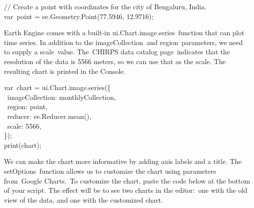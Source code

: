 \documentclass[
  letterpaper,
  DIV=11,
  numbers=noendperiod]{scrreprt}
\begin{document}
// Create a point with coordinates for the city of Bengaluru, India.\\
var~point = ee.Geometry.Point(77.5946, 12.9716);

Earth Engine comes with a built-in ui.Chart.image.series~function that
can plot time series. In addition to the imageCollection~and
region~parameters, we need to supply a scale~value. The~CHIRPS data
catalog page~indicates that the resolution of the data is
\hspace{0pt}\hspace{0pt}5566 meters, so we can use that as the scale.
The resulting chart is printed in the Console.

var~chart = ui.Chart.image.series(\{\\
\hspace*{0.333em} ~imageCollection: monthlyCollection,\\
\hspace*{0.333em} ~region: point,\\
\hspace*{0.333em} ~reducer: ee.Reducer.mean(),\\
\hspace*{0.333em} ~scale: 5566,\\
\});\\
print(chart);

We can make the chart more informative by adding axis labels and a
title. The setOptions~function allows us to customize the chart using
parameters from~Google Charts.~To customize the chart, paste the code
below at the bottom of your script. The effect will be to see two charts
in the editor:~one with the old view of the data, and one with the
customized chart.
\end{document}
